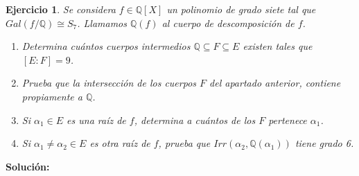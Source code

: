 \documentclass{article}
\theoremstyle{theorem-style}  %
\theoremstyle{definition-style}
\theoremstyle{example-style}
\newtheorem{exercise}{Ejercicio}[section]
\begin{document}
\begin{exercise}
Se considera $f \in \mathbb{Q}[X]$ un polinomio de grado siete tal que $Gal(f/\mathbb{Q}) \cong S_7$. Llamamos $\mathbb{Q}(f)$ al cuerpo de descomposición de $f$. 

\begin{enumerate}
\item Determina cuántos cuerpos intermedios $\mathbb{Q} \subseteq F \subseteq E$ existen tales que $[E:F] = 9$.
\item Prueba que la intersección de los cuerpos $F$ del apartado anterior, contiene propiamente a $\mathbb{Q}$.
\item Si $\alpha_1 \in E$ es una raíz de $f$, determina a cuántos de los $F$ pertenece $\alpha_1$.
\item Si $\alpha_1 \neq \alpha_2 \in E$ es otra raíz de $f$, prueba que $Irr(\alpha_2,\mathbb{Q}(\alpha_1))$ tiene grado 6. 
\end{enumerate}
\end{exercise}

\textbf{Solución:}
\end{document}

